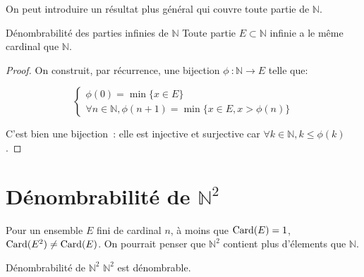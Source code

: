 \documentclass[a4paper,french,final]{memoir}
\begin{document}
On peut introduire un résultat plus général qui couvre toute partie de $\mathbb{N}$. 

\begin{theoremb}{Dénombrabilité des parties infinies de $\mathbb{N}$}{}
	Toute partie $E \subset \mathbb{N}$ infinie a le même cardinal que $\mathbb{N}$. 
\end{theoremb}

\begin{proof}
	On construit, par récurrence, une bijection $\phi~: \mathbb{N} \to E$ telle que: 
	
	\[\left\lbrace \begin{array}{c}
	\phi(0) = \min \{x \in E\} \\
	\forall n \in \mathbb{N}, \phi(n+1) = \min \{x \in E, x > \phi(n) \}
	\end{array} \right.\]
	
	C'est bien une bijection~: elle est injective et surjective car $\forall k \in \mathbb{N}, k \leq \phi(k)$. 
\end{proof}

\section{\texorpdfstring{Dénombrabilité de $\mathbb{N}^2$}{Dénombrabilité de N²}}

Pour un ensemble $E$ fini de cardinal $n$, à moins que $\operatorname{Card}(E) = 1$, $\operatorname{Card}(E^2) \neq \operatorname{Card}(E)$. On pourrait penser que $\mathbb{N}^2 $ contient plus d'élements que $\mathbb{N}$. 

\begin{theoremb}{Dénombrabilité de $\mathbb{N}^2$}{}
	$\mathbb{N}^2$ est dénombrable. 
\end{theoremb}
\end{document}
